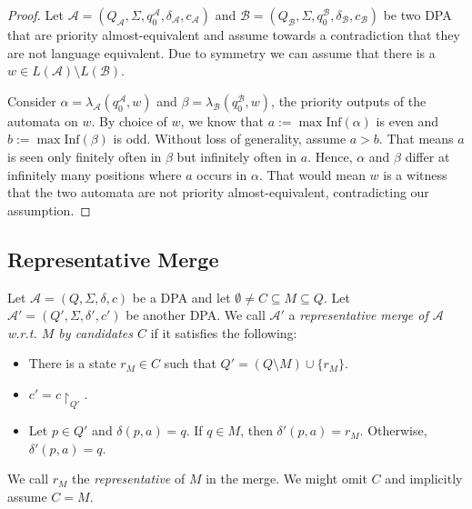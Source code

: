 \begin{proof}
	Let $\mathcal{A} = (Q_\mathcal{A}, \Sigma, q_0^\mathcal{A}, \delta_\mathcal{A}, c_\mathcal{A})$ and $\mathcal{B} = (Q_\mathcal{B}, \Sigma, q_0^\mathcal{B}, \delta_\mathcal{B}, c_\mathcal{B})$ be two DPA that are priority almost-equivalent and assume towards a contradiction that they are not language equivalent. Due to symmetry we can assume that there is a $w \in L(\mathcal{A}) \setminus L(\mathcal{B})$. 
	
	Consider $\alpha = \lambda_\mathcal{A}(q_0^\mathcal{A}, w)$ and $\beta = \lambda_\mathcal{B}(q_0^\mathcal{B}, w)$, the priority outputs of the automata on $w$. By choice of $w$, we know that $a := \max \text{Inf}(\alpha)$ is even and $b := \max \text{Inf}(\beta)$ is odd. Without loss of generality, assume $a > b$. That means $a$ is seen only finitely often in $\beta$ but infinitely often in $a$. Hence, $\alpha$ and $\beta$ differ at infinitely many positions where $a$ occurs in $\alpha$. That would mean $w$ is a witness that the two automata are not priority almost-equivalent, contradicting our assumption.
	
\end{proof}






\subsection{Representative Merge}

\begin{defn}
	Let $\mathcal{A} = (Q, \Sigma, \delta, c)$ be a DPA and let $\emptyset \neq C \subseteq M \subseteq Q$. Let $\mathcal{A}' = (Q', \Sigma, \delta', c')$ be another DPA. We call $\mathcal{A}'$ a \emph{representative merge of $\mathcal{A}$ w.r.t. $M$ by candidates $C$} if it satisfies the following:
	\begin{itemize}
		\item There is a state $r_M \in C$ such that $Q' = (Q \setminus M) \cup \{r_M\}$.
		\item $c' = c\upharpoonright_{Q'}$.
		\item Let $p \in Q'$ and $\delta(p, a) = q$. If $q \in M $, then $\delta'(p, a) = r_M$. Otherwise, $\delta'(p, a) = q$. 
	\end{itemize}
	
	We call $r_M$ the \emph{representative} of $M$ in the merge. We might omit $C$ and implicitly assume $C = M$.
\end{defn}

